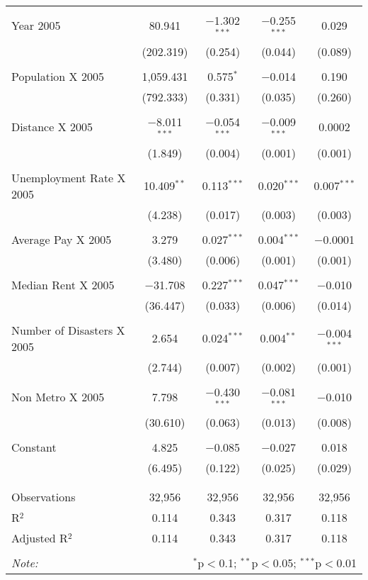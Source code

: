 \documentclass[]{article}
\begin{document}
\begin{table}[!htbp]
\begin{tabular}{@{\extracolsep{5pt}}lcccc}
  & & & & \\ 
 Year 2005 & 80.941 & $-$1.302$^{***}$ & $-$0.255$^{***}$ & 0.029 \\ 
  & (202.319) & (0.254) & (0.044) & (0.089) \\ 
  & & & & \\ 
 Population X 2005 & 1,059.431 & 0.575$^{*}$ & $-$0.014 & 0.190 \\ 
  & (792.333) & (0.331) & (0.035) & (0.260) \\ 
  & & & & \\ 
 Distance X 2005 & $-$8.011$^{***}$ & $-$0.054$^{***}$ & $-$0.009$^{***}$ & 0.0002 \\ 
  & (1.849) & (0.004) & (0.001) & (0.001) \\ 
  & & & & \\ 
 Unemployment Rate X 2005  & 10.409$^{**}$ & 0.113$^{***}$ & 0.020$^{***}$ & 0.007$^{***}$ \\ 
  & (4.238) & (0.017) & (0.003) & (0.003) \\ 
  & & & & \\ 
 Average Pay X 2005 & 3.279 & 0.027$^{***}$ & 0.004$^{***}$ & $-$0.0001 \\ 
  & (3.480) & (0.006) & (0.001) & (0.001) \\ 
  & & & & \\ 
 Median Rent X 2005 & $-$31.708 & 0.227$^{***}$ & 0.047$^{***}$ & $-$0.010 \\ 
  & (36.447) & (0.033) & (0.006) & (0.014) \\ 
  & & & & \\ 
 Number of Disasters X 2005 & 2.654 & 0.024$^{***}$ & 0.004$^{**}$ & $-$0.004$^{***}$ \\ 
  & (2.744) & (0.007) & (0.002) & (0.001) \\ 
  & & & & \\ 
 Non Metro X 2005 & 7.798 & $-$0.430$^{***}$ & $-$0.081$^{***}$ & $-$0.010 \\ 
  & (30.610) & (0.063) & (0.013) & (0.008) \\ 
  & & & & \\ 
 Constant & 4.825 & $-$0.085 & $-$0.027 & 0.018 \\ 
  & (6.495) & (0.122) & (0.025) & (0.029) \\ 
  & & & & \\ 
\hline \\[-1.8ex] 
Observations & 32,956 & 32,956 & 32,956 & 32,956 \\ 
R$^{2}$ & 0.114 & 0.343 & 0.317 & 0.118 \\ 
Adjusted R$^{2}$ & 0.114 & 0.343 & 0.317 & 0.118 \\ 
\hline 
\hline \\[-1.8ex] 
\textit{Note:}  & \multicolumn{4}{r}{$^{*}$p$<$0.1; $^{**}$p$<$0.05; $^{***}$p$<$0.01} \\ 
\end{tabular} 
\end{table}
\end{document}
